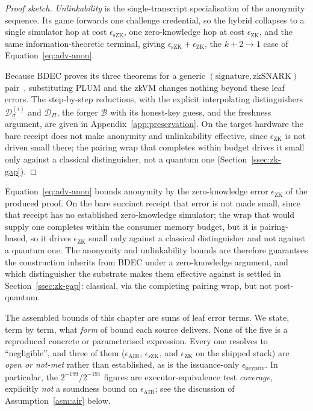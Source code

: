 \begin{proof}[Proof sketch]
    \emph{Unlinkability} is the single-transcript specialisation of the anonymity sequence. Its game forwards one challenge credential, so the hybrid collapses to a single simulator hop at cost $\epsilon_{\mathrm{sZK}}$, one zero-knowledge hop at cost $\epsilon_{\mathrm{ZK}}$, and the same information-theoretic terminal, giving $\epsilon_{\mathrm{sZK}} +\epsilon_{\mathrm{ZK}}$, the $k+2\to1$ case of Equation~\eqref{eq:adv-anon}.
    
    Because BDEC proves its three theorems for a generic $(\text{signature},\text{zkSNARK})$ pair~\cite{10.1007/978-981-96-0957-4_3}, substituting PLUM and the zkVM changes nothing beyond these leaf errors. The step-by-step reductions, with the explicit interpolating distinguishers $\mathcal D_\sigma^{(i)}$ and $\mathcal D_\Pi$, the forger $\mathcal B$ with its honest-key guess, and the freshness argument, are given in Appendix~\ref{app:preservation}. On the target hardware the bare receipt does not make anonymity and unlinkability effective, since $\epsilon_{\mathrm{ZK}}$ is not driven small there; the pairing wrap that completes within budget drives it small only against a classical distinguisher, not a quantum one (Section~\ref{ssec:zk-gap}).
\end{proof}

\begin{remark}
    Equation~\eqref{eq:adv-anon} bounds anonymity by the zero-knowledge error $\epsilon_{\mathrm{ZK}}$ of the produced proof. On the bare succinct receipt that error is not made small, since that receipt has no established zero-knowledge simulator; the wrap that would supply one completes within the consumer memory budget, but it is pairing-based, so it drives $\epsilon_{\mathrm{ZK}}$ small only against a classical distinguisher and not against a quantum one. The anonymity and unlinkability bounds are therefore guarantees the construction inherits from BDEC under a zero-knowledge argument, and which distinguisher the substrate makes them effective against is settled in Section~\ref{ssec:zk-gap}: classical, via the completing pairing wrap, but not post-quantum.
\end{remark}

The assembled bounds of this chapter are sums of leaf error terms. We state, term by term, what \emph{form} of bound each source delivers. None of the five is a reproduced concrete or parameterised expression. Every one resolves to ``negligible'', and three of them (\(\epsilon_{\mathrm{AIR}}\), \(\epsilon_{\mathrm{sZK}}\), and \(\epsilon_{\mathrm{ZK}}\) on the shipped stack) are \emph{open or not-met} rather than established, as is the issuance-only \(\epsilon_{\mathrm{keypriv}}\). In particular, the $2^{-199}$/$2^{-191}$ figures are executor-equivalence test \emph{coverage}, explicitly \emph{not} a soundness bound on \(\epsilon_{\mathrm{AIR}}\); see the discussion of Assumption~\ref{asm:air} below.

